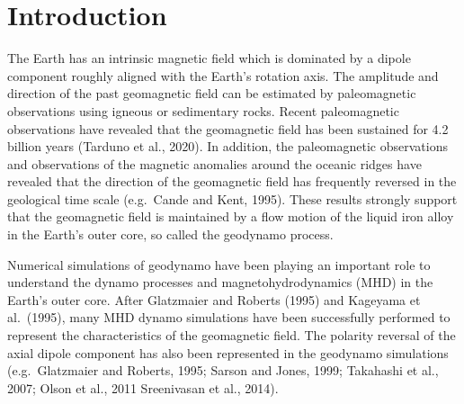 \newpage
\section{Introduction}
\label{section:introduction}
The Earth has an intrinsic magnetic field which is dominated by a dipole component roughly aligned with the Earth's rotation axis. 
The amplitude and direction of the past geomagnetic field can be estimated by paleomagnetic observations using igneous or sedimentary rocks. Recent paleomagnetic observations have revealed that the geomagnetic field has been sustained for 4.2 billion years (Tarduno et al., 2020). %
In addition, the paleomagnetic observations and observations of the magnetic anomalies around the oceanic ridges have revealed that the direction of the geomagnetic field has frequently reversed in the geological time scale (e.g.\ Cande and Kent, 1995). %
These results strongly support that the geomagnetic field is maintained by a flow motion of the liquid iron alloy in the Earth's outer core, so called the geodynamo process.

{\color{red}
Numerical simulations of geodynamo have been playing an important role to understand the dynamo processes and magnetohydrodynamics (MHD) in the Earth's outer core.
}
After Glatzmaier and Roberts (1995) %
and Kageyama et al.\ (1995), %
many MHD dynamo simulations have been successfully performed to represent the characteristics of the geomagnetic field. 
The polarity reversal of the axial dipole component has also been represented in the geodynamo simulations (e.g.\ Glatzmaier and Roberts, 1995; 
Sarson and Jones, 1999;
Takahashi et al., 2007; 
Olson et al., 2011 
Sreenivasan et al., 2014). %

